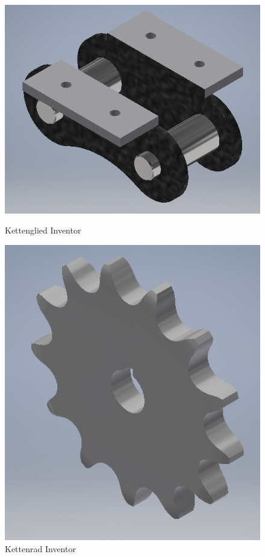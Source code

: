 \begin{figure}[H]
   \begin{minipage}[hbt]{.4\linewidth} %
      \includegraphics[width=\linewidth]{Bilder/Inventor/Kettenglied}
      \caption{Kettenglied Inventor}
      \label{Kettenglied_Inventor} 
   \end{minipage}
   \hspace{.2\linewidth}%
   \begin{minipage}[hbt]{.4\linewidth} %
      \includegraphics[width=\linewidth]{Bilder/Inventor/Kettenrad}
      \caption{Kettenrad Inventor}
      \label{Kettenrad_Inventor}
   \end{minipage}
\end{figure}

